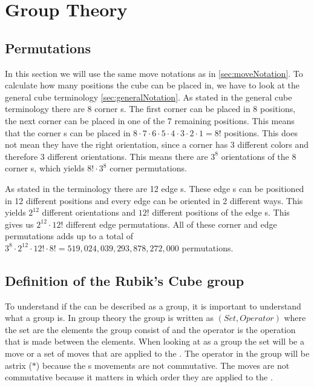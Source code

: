 \chapter{Group Theory}


\section{Permutations}
In this section we will use the same move notations as in \ref{sec:moveNotation}.
To calculate how many positions the cube can be placed in, we have to look at the general cube terminology \ref{sec:generalNotation}.
As stated in the general cube terminology there are 8 corner \cpiece{}s. The first corner \cpiece{} can be placed in 8 positions, the next corner \cpiece{} can be placed in one of the 7 remaining positions. %
This means that the corner \cpiece{}s can be placed in $8\cdot7\cdot6\cdot5\cdot4\cdot3\cdot2\cdot1=8!$ positions. 
This does not mean they have the right orientation, since a corner \cpiece{} has 3 different colors and therefore 3 different orientations. This means there are $3^8$ orientations of the 8 corner \cpiece{}s, which yields $8!\cdot3^8$ corner permutations. 

As stated in the terminology there are 12 edge \cpiece{}s. These edge \cpiece{}s can be positioned in 12 different positions and every edge \cpiece{} can be oriented in 2 different ways. This yields $2^12$ different orientations and $12!$ different positions of the edge \cpiece{}s. This gives us $2^{12}\cdot12!$ different edge permutations. All of these corner and edge permutations adds up to a total of  $3^8\cdot2^{12}\cdot12!\cdot8!=519,024,039,293,878,272,000$ permutations.

\section{Definition of the Rubik's Cube group}
To understand if the \rubik{} can be described as a group, it is important to understand what a group is.
In group theory the group is written as $(Set, Operator)$ where the set are the elements the group consist of and the operator is the operation that is made between the elements. When looking at \rubik{} as a group the set will be a move or a set of moves that are applied to the \rubik{}. The operator in the \rubik{} group will be astrix ($*$) because the \rubik{}s movements are not commutative. The moves are not commutative because it matters in which order they are applied to the \rubik{}\cite[p. 157]{Rubik87}.

